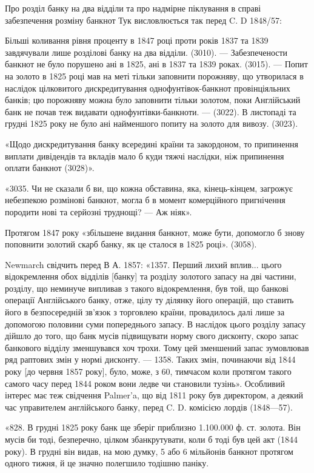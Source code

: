 
Про розділ банку на два відділи та про надмірне піклування в справі забезпечення
розміну банкнот Тук висловлюється так перед C. D 1848/57:

Більші коливання рівня проценту в 1847 році проти років 1837 та 1839
завдячували лише розділові банку на два відділи. (3010). — Забезпечености банкнот
не було порушено ані в 1825, ані в 1837 та 1839 роках. (3015). — Попит
на золото в 1825 році мав на меті тільки заповнити порожняву, що утворилася
в наслідок цілковитого дискредитування однофунтівок-банкнот провінціяльних
банків; цю порожняву можна було заповнити тільки золотом, поки Англійський
банк не почав теж видавати однофунтівки-банкноти. — (3022). В листопаді та
грудні 1825 року не було ані найменшого попиту на золото для вивозу. (3023).

«Щодо дискредитування банку всередині країни та закордоном, то припинення
виплати дивідендів та вкладів мало б куди тяжчі наслідки, ніж припинення
оплати банкнот (3028)».

«3035. Чи не сказали б ви, що кожна обставина, яка, кінець-кінцем,
загрожує небезпекою розмінові банкнот, могла б в момент комерційного пригнічення
породити нові та серйозні труднощі? — Аж ніяк».

Протягом 1847 року «збільшене видання банкнот, може бути, допомогло б
знову поповнити золотий скарб банку, як це сталося в 1825 році». (3058).

Newmarch свідчить перед В А. 1857: «1357. Перший лихий вплив...
цього відокремлення обох відділів [банку] та розділу золотого запасу на дві частини,
розділу, що неминуче випливав з такого відокремлення, був той, що банкові
операції Англійського банку, отже, цілу ту ділянку його операцій, що ставить
його в безпосередній зв’язок з торговлею країни, провадилось далі лише за допомогою
половини суми попереднього запасу. В наслідок цього розділу запасу
дійшло до того, що банк мусів підвищувати норму свого дисконту, скоро запас
банкового відділу зменшувався хоч трохи. Тому цей зменшений запас зумовлював
ряд раптових змін у нормі дисконту. — 1358. Таких змін, починаючи від
1844 року [до червня 1857 року], було, може, з 60, тимчасом коли протягом
такого самого часу перед 1844 роком вони ледве чи становили тузінь». Особливий
інтерес має теж свідчення Palmer’a, що від 1811 року був директором, а
деякий час управителем англійського банку, перед C. D. комісією лордів (1848—57).

«828. В грудні 1825 року банк ще зберіг приблизно 1.100.000 ф. ст.
золота. Він мусів би тоді, безперечно, цілком збанкрутувати, коли б тоді був
цей акт (1844 року). В грудні він видав, на мою думку, 5 або 6 мільйонів
банкнот протягом одного тижня, й це значно полегшило тодішню паніку.

